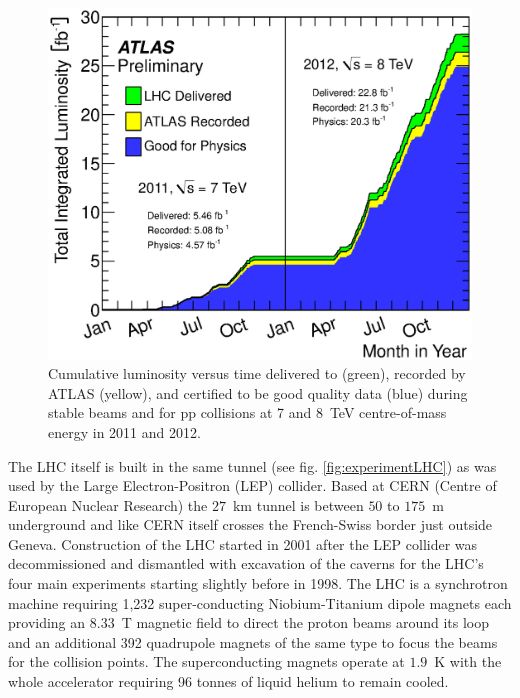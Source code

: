 	\begin{figure}[h!]
        \begin{center}
			\includegraphics[scale=0.8]{images/intlumivstime2011-2012DQ.eps}
        \end{center}
        \caption{Cumulative luminosity versus time delivered to (green), recorded by ATLAS (yellow), and certified to be good quality data (blue) during stable beams and for pp collisions at 7 and 8~TeV centre-of-mass energy in 2011 and 2012. \cite{LuPublicResults}}
        \label{fig:lum}
    \end{figure}

	
	The LHC itself is built in the same tunnel (see fig. \ref{fig:experimentLHC}) as was used by the Large Electron-Positron (LEP) collider. Based at CERN (Centre of European Nuclear Research) the $27$~km tunnel is between $50$ to $175$~m underground and like CERN itself crosses the French-Swiss border just outside Geneva. Construction of the LHC started in 2001 after the LEP collider was decommissioned and dismantled with excavation of the caverns for the LHC's four main experiments starting slightly before in 1998. 
	The LHC is a synchrotron machine requiring 1,232 super-conducting Niobium-Titanium dipole magnets each providing an $8.33$~T magnetic field to direct the proton beams around its loop and an additional 392 quadrupole magnets of the same type to focus the beams for the collision points. The superconducting magnets operate at $1.9$~K with the whole accelerator requiring 96 tonnes of liquid helium to remain cooled.\\


